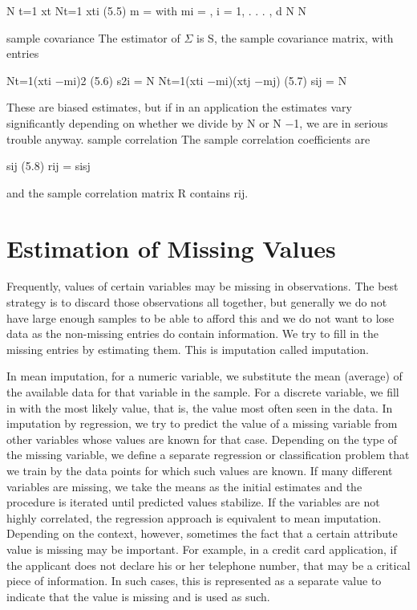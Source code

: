 N t=1 xt Nt=1 xti (5.5) m = with mi = , i = 1, . . . , d N N

sample covariance The estimator of $\Sigma$ is S, the sample covariance matrix, with entries

Nt=1(xti $-$mi)2 (5.6) s2i = N Nt=1(xti $-$mi)(xtj $-$mj) (5.7) sij = N

These are biased estimates, but if in an application the estimates vary significantly depending on whether we divide by N or N $-$1, we are in serious trouble anyway. sample correlation The sample correlation coefficients are

sij (5.8) rij = sisj

and the sample correlation matrix R contains rij.

\section{Estimation of Missing Values}

Frequently, values of certain variables may be missing in observations. The best strategy is to discard those observations all together, but generally we do not have large enough samples to be able to afford this and we do not want to lose data as the non-missing entries do contain information. We try to fill in the missing entries by estimating them. This is imputation called imputation.

In mean imputation, for a numeric variable, we substitute the mean (average) of the available data for that variable in the sample. For a discrete variable, we fill in with the most likely value, that is, the value most often seen in the data. In imputation by regression, we try to predict the value of a missing variable from other variables whose values are known for that case. Depending on the type of the missing variable, we define a separate regression or classification problem that we train by the data points for which such values are known. If many different variables are missing, we take the means as the initial estimates and the procedure is iterated until predicted values stabilize. If the variables are not highly correlated, the regression approach is equivalent to mean imputation. Depending on the context, however, sometimes the fact that a certain attribute value is missing may be important. For example, in a credit card application, if the applicant does not declare his or her telephone number, that may be a critical piece of information. In such cases, this is represented as a separate value to indicate that the value is missing and is used as such.

